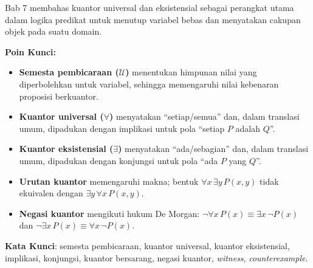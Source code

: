 \documentclass[../main]{subfiles}
\begin{document}
\begin{rangkuman}
Bab 7 membahas kuantor universal dan eksistensial sebagai perangkat utama dalam logika predikat untuk menutup variabel bebas dan menyatakan cakupan objek pada suatu domain.

\textbf{Poin Kunci:}
\begin{itemize}
  \item \textbf{Semesta pembicaraan ($\mathcal{U}$)} menentukan himpunan nilai yang diperbolehkan untuk variabel, sehingga memengaruhi nilai kebenaran proposisi berkuantor.
  \item \textbf{Kuantor universal ($\forall$)} menyatakan ``setiap/semua'' dan, dalam translasi umum, dipadukan dengan implikasi untuk pola ``setiap $P$ adalah $Q$''.
  \item \textbf{Kuantor eksistensial ($\exists$)} menyatakan ``ada/sebagian'' dan, dalam translasi umum, dipadukan dengan konjungsi untuk pola ``ada $P$ yang $Q$''.
  \item \textbf{Urutan kuantor} memengaruhi makna; bentuk $\forall x \, \exists y \, P(x,y)$ tidak ekuivalen dengan $\exists y \, \forall x \, P(x,y)$.
  \item \textbf{Negasi kuantor} mengikuti hukum De Morgan: $\neg \forall x \, P(x) \equiv \exists x \, \neg P(x)$ dan $\neg \exists x \, P(x) \equiv \forall x \, \neg P(x)$.
\end{itemize}

\textbf{Kata Kunci}: semesta pembicaraan, kuantor universal, kuantor eksistensial, implikasi, konjungsi, kuantor bersarang, negasi kuantor, \textit{witness}, \textit{counterexample}.
\end{rangkuman}

\ifSubfilesClassLoaded{
  \renewcommand{\bibname}{Daftar Pustaka}
  
  
}{}
\end{document}
